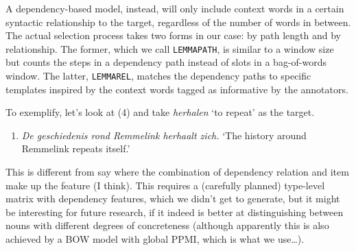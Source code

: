 \documentclass[
]{book}
\providecommand{\tightlist}{%
  \setlength{\itemsep}{0pt}\setlength{\parskip}{0pt}}
\begin{document}
A dependency-based model, instead, will only include context words in a certain
syntactic relationship to the target, regardless of the number of words in between.
The actual selection process takes two forms in our case: by path length and by
relationship. The former, which we call \texttt{LEMMAPATH}, is similar to a window size
but counts the steps in a dependency path instead of slots in a bag-of-words window.
The latter, \texttt{LEMMAREL}, matches the dependency paths to specific templates inspired
by the context words tagged as informative by the annotators.

To exemplify, let's look at (4) and take \emph{herhalen} `to repeat' as the target.

\begin{enumerate}
\def\labelenumi{(\arabic{enumi})}
\setcounter{enumi}{3}
\tightlist
\item
  \emph{De geschiedenis rond Remmelink herhaalt zich.} `The history around Remmelink repeats itself.'
\end{enumerate}

This is different from say \textcite{vandecruys_2008} where the combination of dependency relation and item make up the feature (I think). This requires a (carefully planned) type-level matrix with dependency features, which we didn't get to generate, but it might be interesting for future research, if it indeed is better at distinguishing between nouns with different degrees of concreteness (although apparently this is also achieved by a BOW model with global PPMI, which is what we use\ldots).
\end{document}
